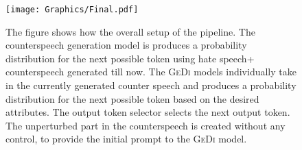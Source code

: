 
\begin{figure}
    \centering
    \texttt{[image: Graphics/Final.pdf]}
    \caption{\scriptsize{The figure shows how the overall setup of the pipeline. The counterspeech generation model is produces a probability distribution for the next possible token using hate speech+ counterspeech generated till now. The \textsc{GeDi} models individually take in the currently generated counter speech and produces a probability distribution for the next possible token based on the desired attributes. The output token selector selects the next output token. The unperturbed part in the counterspeech is created without any control, to provide the initial prompt to the \textsc{GeDi} model.}}
    \label{fig:pipeline}
\end{figure}

